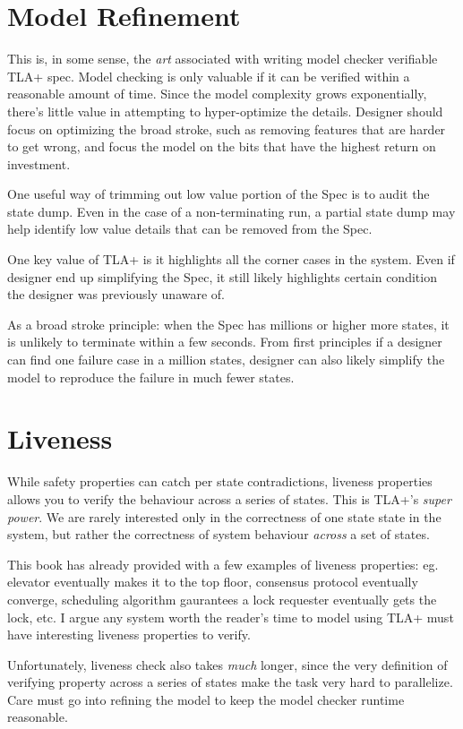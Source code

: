 \section{Model Refinement}

This is, in some sense, the \textit{art} associated with writing model checker
verifiable TLA+ spec. Model checking is only valuable if it can be verified
within a reasonable amount of time. Since the model complexity grows
exponentially, there's little value in attempting to hyper-optimize the details.
Designer should focus on optimizing the broad stroke, such as removing features 
that are harder to get wrong, and focus the model on the bits that have the
highest return on investment.\newline

One useful way of trimming out low value portion of the Spec is to audit the
state dump. Even in the case of a non-terminating run, a partial state dump may
help identify low value details that can be removed from the Spec.\newline

One key value of TLA+ is it highlights all the corner cases in the system. Even
if designer end up simplifying the Spec, it still likely highlights certain
condition the designer was previously unaware of.\newline

As a broad stroke principle: when the Spec has millions or higher more states,
it is unlikely to terminate within a few seconds. From first principles if a
designer can find one failure case in a million states, designer can also likely
simplify the model to reproduce the failure in much fewer states.

\section{Liveness}

While safety properties can catch per state contradictions, liveness properties
allows you to verify the behaviour across a series of states. This is TLA+'s
\textit{super power}. We are rarely interested only in the correctness of one
state state in the system, but rather the correctness of system behaviour
\textit{across} a set of states. \newline

This book has already provided with a few examples of liveness properties: eg.
elevator eventually makes it to the top floor, consensus protocol eventually
converge, scheduling algorithm gaurantees a lock requester eventually gets the
lock, etc. I argue any system worth the reader's time to model using TLA+ must 
have interesting liveness properties to verify.\newline

Unfortunately, liveness check also takes \textit{much} longer, since the very
definition of verifying property across a series of states make the task very
hard to parallelize. Care must go into refining the model to keep the model
checker runtime reasonable.